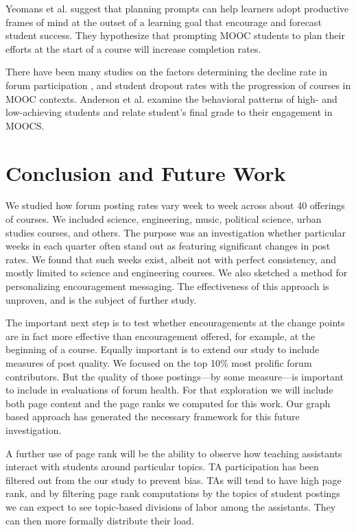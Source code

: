 Yeomans et al. \cite{Yeomans} suggest that planning prompts can help
learners adopt productive frames of mind at the outset of a learning
goal that encourage and forecast student success. They hypothesize
that prompting MOOC students to plan their efforts at the start of a
course will increase completion rates.

There have been many studies on the factors determining the decline
rate in forum participation \cite{DBLP}, and student dropout rates
\cite{Yang_peerinfluence} with the progression of courses in MOOC
contexts. Anderson et al. \cite{DBLP:journals/corr/AndersonHKL14}
examine the behavioral patterns of high- and low-achieving students
and relate student's final grade to their engagement in MOOCS.

\section{Conclusion and Future Work}

We studied how forum posting rates vary week to week across about 40
offerings of courses. We included science, engineering, music,
political science, urban studies courses, and others. The purpose was
an investigation whether particular weeks in each quarter often stand
out as featuring significant changes in post rates. We found that such
weeks exist, albeit not with perfect consistency, and mostly limited
to science and engineering courses. We also sketched a method for
personalizing encouragement messaging. The effectiveness of this
approach is unproven, and is the subject of further study.

The important next step is to test whether encouragements at the
change points are in fact more effective than encouragement offered,
for example, at the beginning of a course. Equally important is to
extend our study to include measures of post quality. We focused on
the top 10\% most prolific forum contributors. But the quality of
those postings---by some measure---is important to include in
evaluations of forum health. For that exploration we will include both
page content and the page ranks we computed for this work.  Our graph
based approach has generated the necessary framework for this future
investigation.

A further use of page rank will be the ability to observe how teaching
assistants interact with students around particular topics. TA participation has been filtered out from the our study to prevent bias. TAs will
tend to have high page rank, and by filtering page rank computations
by the topics of student postings we can expect to see topic-based
divisions of labor among the assistants. They can then more formally
distribute their load.

